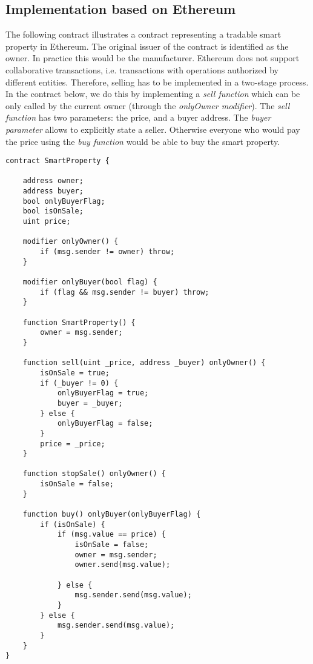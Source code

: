 \subsection{Implementation based on Ethereum}

The following contract illustrates a contract representing a tradable smart property in Ethereum. The original issuer of the contract is identified as the owner. In practice this would be the manufacturer. Ethereum does not support collaborative transactions, i.e. transactions with operations authorized by different entities. Therefore, selling has to be implemented in a two-stage process. In the contract below, we do this by implementing a \emph{sell function} which can be only called by the current owner (through the \emph{onlyOwner modifier}). The \emph{sell function} has two parameters: the price, and a buyer address. The \emph{buyer parameter} allows to explicitly state a seller. Otherwise everyone who would pay the price using the \emph{buy function} would be able to buy the smart property.

\newpage
\begin{lstlisting}[breaklines,basicstyle=\tiny]
contract SmartProperty {
    
    address owner;
    address buyer;
    bool onlyBuyerFlag;
    bool isOnSale;
    uint price;
    
    modifier onlyOwner() {
        if (msg.sender != owner) throw;
    }
    
    modifier onlyBuyer(bool flag) {
        if (flag && msg.sender != buyer) throw;
    }
    
    function SmartProperty() {
        owner = msg.sender;
    }
    
    function sell(uint _price, address _buyer) onlyOwner() {
        isOnSale = true;
        if (_buyer != 0) {
            onlyBuyerFlag = true;
            buyer = _buyer;
        } else {
            onlyBuyerFlag = false;
        }
        price = _price;
    }
    
    function stopSale() onlyOwner() {
        isOnSale = false;
    }
        
    function buy() onlyBuyer(onlyBuyerFlag) {
        if (isOnSale) {
            if (msg.value == price) {
                isOnSale = false;
                owner = msg.sender;
                owner.send(msg.value);
                
            } else {
                msg.sender.send(msg.value);
            }
        } else {
            msg.sender.send(msg.value);
        }
    }
}
\end{lstlisting}


